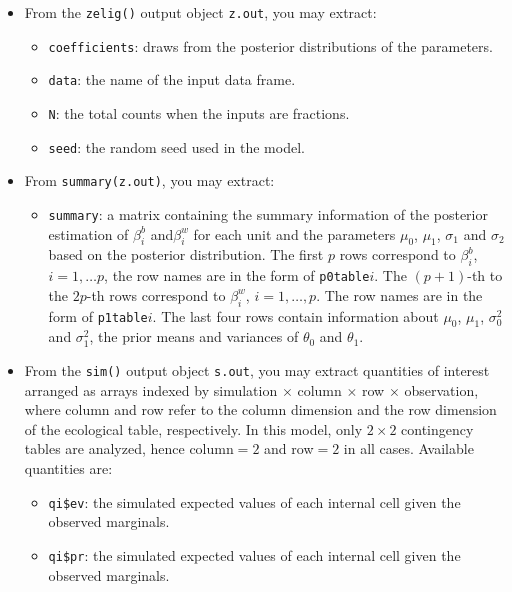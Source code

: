 \begin{itemize}
\item From the \texttt{zelig()} output object \texttt{z.out}, 
you may extract:

\begin{itemize}
\item \texttt{coefficients}: draws from the posterior distributions
of the parameters.
\item \texttt{data}: the name of the input data frame.
\item \texttt{N}: the total counts when the inputs are fractions.
\item \texttt{seed}: the random seed used in the model.
\end{itemize}

\item From \texttt{summary(z.out)}, you may extract:
\begin{itemize}
\item \texttt{summary}: a matrix containing the summary information of the 
posterior estimation of $\beta^b_i$ and$\beta^w_i$ for each unit and
the parameters $\mu_0$, $\mu_1$, $\sigma_1$ and $\sigma_2$ based on
the posterior distribution.  The first $p$ rows correspond to
$\beta_i^b$, $i=1,\ldots p$, the row names are in the form of
\texttt{p0table}$i$. The $(p+1)$-th to the $2p$-th rows correspond to
$\beta_i^w$, $i=1,\ldots,p$. The row names are in the form of
\texttt{p1table}$i$. The last four rows contain information about
$\mu_0$, $\mu_1$, $\sigma_0^2$ and $\sigma_1^2$, the prior means and
variances of $\theta_0$ and $\theta_1$. 
\end{itemize}
\item From the \texttt{sim()} output object \texttt{s.out}, you may
extract quantities of interest arranged as arrays indexed by
simulation $\times$ column $\times$ row $\times$ observation, where
column and row refer to the column dimension and the row dimension of
the ecological table, respectively. In this model, only $2 \times 2$
contingency tables are analyzed, hence column$=2$ and row$=2$ in all
cases. Available quantities are:
\begin{itemize}
\item \texttt{qi\$ev}: the simulated expected values of each internal
cell given the observed marginals.
\item \texttt{qi\$pr}: the simulated expected values of each internal
cell given the observed marginals.
\end{itemize}

\end{itemize}

